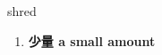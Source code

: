 
\begin{frame}
{\huge shred}
\begin{center}
\begin{enumerate}\Large
  \item \textbf{少量 a small amount}
\end{enumerate}
\end{center}
\end{frame}
